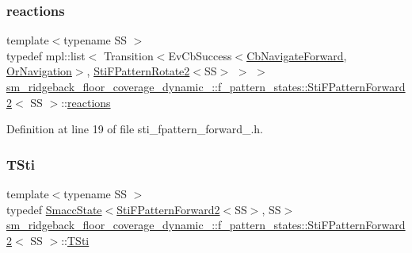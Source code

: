 \subsubsection{\texorpdfstring{reactions}{reactions}}
{\footnotesize\ttfamily template$<$typename SS $>$ \\
typedef mpl\+::list$<$ Transition$<$Ev\+Cb\+Success$<$\hyperlink{classcl__move__base__z_1_1CbNavigateForward}{Cb\+Navigate\+Forward}, \hyperlink{classsm__ridgeback__floor__coverage__dynamic__1_1_1OrNavigation}{Or\+Navigation}$>$, \hyperlink{structsm__ridgeback__floor__coverage__dynamic__1_1_1f__pattern__states_1_1StiFPatternRotate2}{Sti\+F\+Pattern\+Rotate2}$<$SS$>$ $>$ $>$ \hyperlink{structsm__ridgeback__floor__coverage__dynamic__1_1_1f__pattern__states_1_1StiFPatternForward2}{sm\+\_\+ridgeback\+\_\+floor\+\_\+coverage\+\_\+dynamic\+\_\+::f\+\_\+pattern\+\_\+states\+::\+Sti\+F\+Pattern\+Forward2}$<$ SS $>$\+::\hyperlink{structsm__ridgeback__floor__coverage__dynamic__1_1_1f__pattern__states_1_1StiFPatternForward2_ad691b196400a95f809744191e95d0486}{reactions}}



Definition at line 19 of file sti\+\_\+fpattern\+\_\+forward\+\_.\+h.

\mbox{\label{structsm__ridgeback__floor__coverage__dynamic__1_1_1f__pattern__states_1_1StiFPatternForward2_a8aefeda207e5751e62b6a62e2901c8f9}} 
\subsubsection{\texorpdfstring{T\+Sti}{TSti}}
{\footnotesize\ttfamily template$<$typename SS $>$ \\
typedef \hyperlink{classSmaccState}{Smacc\+State}$<$\hyperlink{structsm__ridgeback__floor__coverage__dynamic__1_1_1f__pattern__states_1_1StiFPatternForward2}{Sti\+F\+Pattern\+Forward2}$<$SS$>$, SS$>$ \hyperlink{structsm__ridgeback__floor__coverage__dynamic__1_1_1f__pattern__states_1_1StiFPatternForward2}{sm\+\_\+ridgeback\+\_\+floor\+\_\+coverage\+\_\+dynamic\+\_\+::f\+\_\+pattern\+\_\+states\+::\+Sti\+F\+Pattern\+Forward2}$<$ SS $>$\+::\hyperlink{structsm__ridgeback__floor__coverage__dynamic__1_1_1f__pattern__states_1_1StiFPatternForward2_a8aefeda207e5751e62b6a62e2901c8f9}{T\+Sti}}




